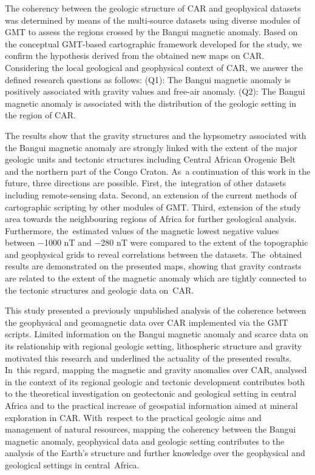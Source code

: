 \documentclass[minerals,article,accept,pdftex,moreauthors]{Definitions/mdpi}
\begin{document}
{The coherency between the geologic structure of CAR and geophysical datasets was determined by means of the multi-source datasets using diverse modules of GMT to assess the regions crossed by the Bangui magnetic anomaly. Based on the conceptual GMT-based cartographic framework developed for the study, we confirm the hypothesis derived from the obtained new maps on CAR. Considering the local geological and geophysical context of CAR, we answer the defined research questions as follows: (Q1): The Bangui magnetic anomaly is positively associated with gravity values and free-air anomaly. (Q2): The Bangui magnetic anomaly is associated with the distribution of the geologic setting in the region of CAR.}

{The results show that the gravity structures and the hypsometry associated with the Bangui magnetic anomaly are strongly linked with the extent of the major geologic units and tectonic structures including Central African Orogenic Belt and the northern part of the Congo Craton}. As~a continuation of this work in the future, three directions are possible. First, the~integration of other datasets including remote-sensing data. Second, an extension of the current methods of cartographic scripting by other modules of GMT. Third, extension of the study area towards the neighbouring regions of Africa for further geological analysis. %
Furthermore, the~estimated values of the magnetic lowest negative values between $-$1000 nT and $-$280 nT were compared to the extent of the topographic and geophysical grids to reveal correlations between the datasets. The~obtained results are demonstrated on the presented maps, showing that gravity contrasts are related to the extent of the magnetic anomaly which are tightly connected to the tectonic structures and geologic data on~CAR. 

This study presented a previously unpublished analysis of the coherence between the geophysical and geomagnetic data over CAR implemented via the GMT scripts. Limited information on the Bangui magnetic anomaly and scarce data on its relationship with regional geologic setting, lithospheric structure and gravity motivated this research and underlined the actuality of the presented results. In~this regard, mapping the magnetic and gravity anomalies over CAR, analysed in the context of its regional geologic and tectonic development contributes both to the theoretical investigation on geotectonic and geological setting in central Africa and to the practical increase of geospatial information aimed at mineral exploration in CAR. With~respect to the practical geologic aims and management of natural resources, mapping the coherency between the Bangui magnetic anomaly, geophysical data and geologic setting contributes to the analysis of the Earth's structure and further knowledge over the geophysical and geological settings in central~Africa.
\end{document}
